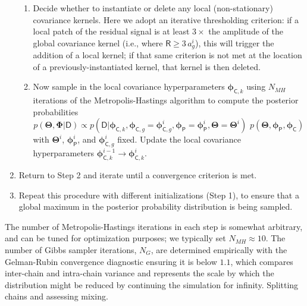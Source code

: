 \documentclass[iop,floatfix]{emulateapj}
\newcommand{\vD}{\mathsf{D}}
\newcommand{\vR}{\mathsf{R}}
\newcommand{\vT}{ {\bm \Theta}}
\newcommand{\vp}{ {\bm \phi}}
\newcommand{\vP}{ {\bm \Phi}}
\newcommand{\cheb}{ \vp_{\mathsf{P}}}
\newcommand{\cov}{ \vp_{\mathsf{C}}}
\begin{document}
\begin{enumerate}
\begin{enumerate}
\item Decide whether to instantiate or delete any local (non-stationary) covariance kernels.  Here 
we adopt an iterative thresholding criterion: if a local patch of the residual signal is at least 
$3\times$ the amplitude of the global covariance kernel (i.e., where $\vR \ge 3 \, a_g^i$), this 
will trigger the addition of a local kernel; if that same criterion is not met at the location of a 
previously-instantiated kernel, that kernel is then deleted.  

\item Now sample in the local covariance hyperparameters $\vp_{{\mathsf C},k}$ using $N_{MH}$ 
iterations of the Metropolis-Hastings algorithm to compute the posterior probabilities
\begin{equation}
p(\vT,\vP|\vD) \propto p(\vD | \vp_{{\mathsf C}, k}, \vp_{{\mathsf C}, g} = \vp_{{\mathsf C, g}}^i, \cheb = \cheb^i, \vT = \vT^i) \,\, p(\vT, \cheb, \cov)
\end{equation}
with $\vT^i$, $\cheb^i$, and $\vp_{{\mathsf C}, g}^i$ fixed.  Update the local covariance 
hyperparameters $\vp_{{\mathsf C}, k}^{i-1} \rightarrow \vp_{{\mathsf C}, k}^i$.
\end{enumerate}

\item Return to Step 2 and iterate until a convergence criterion is met.

\item Repeat this procedure with different initializations (Step 1), to ensure that a global 
maximum in the posterior probability distribution is being sampled.
\end{enumerate}
The number of Metropolis-Hastings iterations in each step is somewhat arbitrary, and can be tuned 
for optimization purposes; we typically set $N_{MH} \approx 10$.  The number of Gibbs sampler 
iterations, $N_G$, are determined empirically with the Gelman-Rubin convergence diagnostic ensuring it is below $1.1$, which compares inter-chain and intra-chain variance \citep[Eqn 11.4]{gelman13} and represents the scale by which the distribution might be reduced by continuing the simulation for infinity. Splitting chains and assessing mixing.
\end{document}
